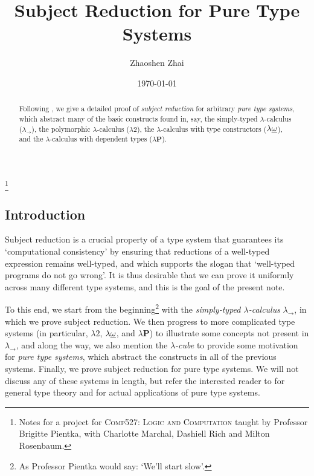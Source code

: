 \documentclass[reqno]{amsart}
\begin{document}
    \title{Subject Reduction for Pure Type Systems}
    \author{Zhaoshen Zhai}
    \address{Department of Mathematics and Statistics, McGill University, 805 Sherbrooke Street West, Montreal, QC, H3A 0B9, Canada}
    \date{\today}
    \thanks{Notes for a project for \textsc{Comp527: Logic and Computation} taught by Professor Brigitte Pientka, with Charlotte Marchal, Dashiell Rich and Milton Rosenbaum.}

    \begin{abstract}
        Following \cite{SU06}, we give a detailed proof of \textit{subject reduction} for arbitrary \textit{pure type systems}, which abstract many of the basic constructs found in, say, the simply-typed $\lambda$-calculus ($\lambda_\rightarrow$), the polymorphic $\lambda$-calculus ($\lambda2$), the $\lambda$-calculus with type constructors ($\lambda\uline{\omega}$), and the $\lambda$-calculus with dependent types ($\lambda\mathbf{P}$).
    \end{abstract}

    \maketitle

    \subsection*{Introduction}

    Subject reduction is a crucial property of a type system that guarantees its `computational consistency' by ensuring that reductions of a well-typed expression remains well-typed, and which supports the slogan that `well-typed programs do not go wrong'. It is thus desirable that we can prove it uniformly across many different type systems, and this is the goal of the present note.

    To this end, we start from the beginning\footnote{As Professor Pientka would say: `We'll start slow'.} with the \textit{simply-typed $\lambda$-calculus} $\lambda_\rightarrow$, in which we prove subject reduction. We then progress to more complicated type systems (in particular, $\lambda2$, $\lambda\uline{\omega}$, and $\lambda\mathbf{P}$) to illustrate some concepts not present in $\lambda_\rightarrow$, and along the way, we also mention the \textit{$\lambda$-cube} to provide some motivation for \textit{pure type systems}, which abstract the constructs in all of the previous systems. Finally, we prove subject reduction for pure type systems. We will not discuss any of these systems in length, but refer the interested reader to \cite{SU06} for general type theory and \cite{Bar91} for actual applications of pure type systems.
\end{document}
